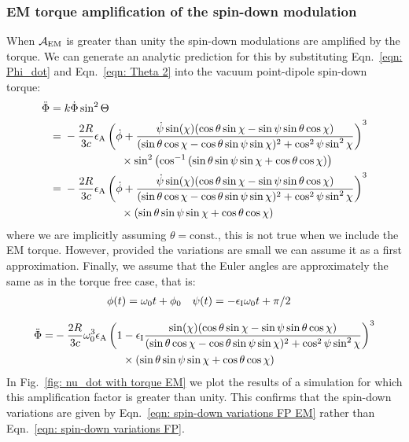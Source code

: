 \documentclass[../full_thesis/full_thesis.tex]{subfiles}
\begin{document}
\subsubsection{EM torque amplification of the spin-down modulation}
When $\mathcal{A}_{\mathrm{EM}}$ is greater than unity the spin-down modulations are amplified by
the torque. We can generate an analytic prediction for this by substituting
Eqn.~\eqref{eqn: Phi_dot} and Eqn.~\eqref{eqn: Theta 2} into the vacuum point-dipole spin-down
torque:
\begin{align*}
\ddot{\Phi} = {} & k \dot{\Phi}\sin^{2}\Theta \\
            = {} & -\frac{2R}{3c} \epsA
                   \left(\dot{\phi}
                         +\frac{\dot{\psi}\sin(\chi)
                                (\cos\theta\sin\chi - \sin \psi \sin \theta \cos\chi)
                               }{
                                (\sin\theta \cos \chi - \cos \theta \sin \psi \sin \chi)^{2}
                         + \cos^{2}\psi \sin^{2} \chi}\right)^{3} \\
            &  \hspace{18mm}  \times  \sin^{2}\left(\cos^{-1}\left(
                     \sin\theta\sin\psi\sin\chi + \cos\theta\cos\chi\right)\right)\\
    = {} & -\frac{2R}{3c} \epsA
    \left(\dot{\phi}+\frac{\dot{\psi} \sin(\chi)(\cos\theta\sin\chi
          -\sin \psi \sin \theta \cos\chi)}
         {(\sin\theta \cos \chi - \cos \theta \sin \psi \sin \chi)^{2}
         + \cos^{2}\psi \sin^{2} \chi}\right)^{3} \\
   & \hspace{18mm} \times \left(\sin\theta\sin\psi\sin\chi + \cos\theta\cos\chi\right)
\end{align*}
where we are implicitly assuming $\theta=\mathrm{const.}$, this is not true
when we include the EM torque. However, provided the variations are small we
can assume it as a first approximation.  Finally, we assume that the Euler angles
are approximately the same as in the torque free case, that is:
\begin{align}
    \phi(t) = \omega_{0}t + \phi_{0} &&& \psi(t) = -\epsilon_{\mathrm{I}} \omega_{0} t + \pi/2
\end{align}

 \begin{align}
\begin{split}
     \ddot{\Phi} =&-\frac{2R}{3c} \omega_{0}^{3}\epsA
     \left(1 -  \epsI\frac{ \sin(\chi)(\cos\theta\sin\chi - \sin \psi \sin \theta \cos\chi)
     }{(\sin\theta \cos \chi - \cos \theta \sin \psi \sin \chi)^{2} + \cos^{2}\psi \sin^{2} \chi}\right)^{3}\\
     &\hspace{22mm}\times\left(\sin\theta\sin\psi\sin\chi + \cos\theta\cos\chi\right)
     \label{eqn: Phi_dot EM}
\end{split}
\end{align}
In Fig.~\ref{fig: nu_dot with torque EM} we plot the results of a simulation
for which this amplification factor is greater than unity. This confirms that the
spin-down variations are given by Eqn.~\ref{eqn: spin-down variations FP EM} rather
than Eqn.~\eqref{eqn: spin-down variations FP}.
\end{document}
